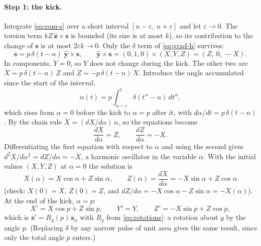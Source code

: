 \documentclass[11pt,a4paper]{article}
\newcommand{\vs}{\bm{s}}
\begin{document}
\paragraph{Step 1: the kick.} Integrate \eqref{eq:eom-s} over a short interval $[n-\varepsilon,\ n+\varepsilon]$
and let $\varepsilon\to0$. The torsion term $kZ\,\hat{\bm z}\times\vs$ is bounded (its size is at most $k$), so
its contribution to the change of $\vs$ is at most $2\varepsilon k \to 0$. Only the $\delta$ term of
\eqref{eq:grad-h} survives:
\begin{equation*}
  \dot{\vs} = p\,\delta(t-n)\;\hat{\bm y}\times\vs, \qquad \hat{\bm y}\times\vs = (0,1,0)\times(X,Y,Z) = (Z,\ 0,\ -X).
\end{equation*}
In components, $\dot Y = 0$, so $Y$ does not change during the kick. The other two are
$\dot X = p\,\delta(t-n)\,Z$ and $\dot Z = -p\,\delta(t-n)\,X$. Introduce the angle accumulated since the start of
the interval,
\begin{equation*}
  \alpha(t) = p\int_{n-\varepsilon}^{t}\delta(t''-n)\,dt'' ,
\end{equation*}
which rises from $\alpha = 0$ before the kick to $\alpha = p$ after it, with $d\alpha/dt = p\,\delta(t-n)$. By the
chain rule $\dot X = (dX/d\alpha)\,\dot\alpha$, so the equations become
\begin{equation*}
  \frac{dX}{d\alpha} = Z, \qquad \frac{dZ}{d\alpha} = -X .
\end{equation*}
Differentiating the first equation with respect to $\alpha$ and using the second gives $d^2X/d\alpha^2 = dZ/d\alpha =
-X$, a harmonic oscillator in the variable $\alpha$. With the initial values $(X,Y,Z)$ at $\alpha = 0$ the solution is
\begin{equation*}
  X(\alpha) = X\cos\alpha + Z\sin\alpha, \qquad Z(\alpha) = \frac{dX}{d\alpha} = -X\sin\alpha + Z\cos\alpha
\end{equation*}
(check: $X(0) = X$, $Z(0) = Z$, and $dZ/d\alpha = -X\cos\alpha - Z\sin\alpha = -X(\alpha)$). At the end of the kick,
$\alpha = p$:
\begin{equation}\label{eq:rotation-y}
  X' = X\cos p + Z\sin p, \qquad Y' = Y, \qquad Z' = -X\sin p + Z\cos p ,
\end{equation}
which is $\vs' = R_y(p)\,\vs_n$ with $R_y$ from \eqref{eq:rotations}: a rotation about $y$ by the angle $p$.
(Replacing $\delta$ by any narrow pulse of unit area gives the same result, since only the total angle $p$ enters.)
\end{document}
